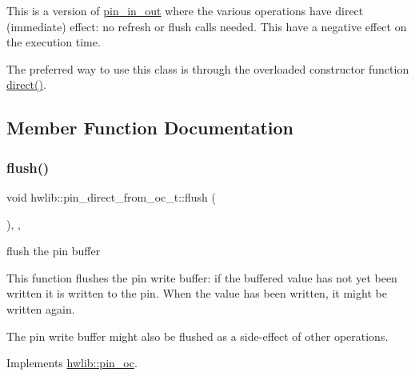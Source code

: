 This is a version of \hyperlink{classhwlib_1_1pin__in__out}{pin\+\_\+in\+\_\+out} where the various operations have direct (immediate) effect\+: no refresh or flush calls needed. This have a negative effect on the execution time.

The preferred way to use this class is through the overloaded constructor function \hyperlink{namespacehwlib_a43941b7f246ad934ee43dbfa0f5c8b5a}{direct()}. 

\subsection{Member Function Documentation}
\mbox{\label{classhwlib_1_1pin__direct__from__oc__t_a3009f8da456f04e889ee1d81e8bcf0b4}} 
\subsubsection{\texorpdfstring{flush()}{flush()}}
{\footnotesize\ttfamily void hwlib\+::pin\+\_\+direct\+\_\+from\+\_\+oc\+\_\+t\+::flush (\begin{DoxyParamCaption}{ }\end{DoxyParamCaption})\hspace{0.3cm}{\ttfamily [inline]}, {\ttfamily [override]}, {\ttfamily [virtual]}}





flush the pin buffer

This function flushes the pin write buffer\+: if the buffered value has not yet been written it is written to the pin. When the value has been written, it might be written again.

The pin write buffer might also be flushed as a side-\/effect of other operations. 

Implements \hyperlink{classhwlib_1_1pin__oc_a021036a4566c712e43250ddd28a85e54}{hwlib\+::pin\+\_\+oc}.

\mbox{\label{classhwlib_1_1pin__direct__from__oc__t_af9243ffeb3095cefb13b7a3daf209339}} 
